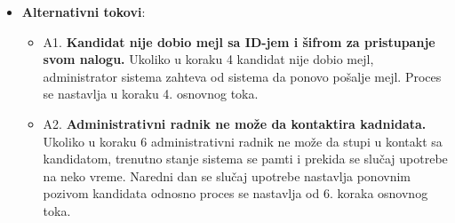\begin{itemize}
  \item \textbf{Alternativni tokovi}:
      \begin{itemize}
        \item A1. \textbf{Kandidat nije dobio mejl sa ID-jem i šifrom za pristupanje svom nalogu.}
        Ukoliko u koraku 4 kandidat nije dobio mejl, administrator sistema zahteva od sistema da ponovo pošalje mejl. Proces se nastavlja u koraku 4. osnovnog toka.
        \item A2. \textbf{Administrativni radnik ne može da kontaktira kadnidata.}
        Ukoliko u koraku 6 administrativni radnik ne može da stupi u kontakt sa kandidatom, trenutno stanje sistema se pamti i prekida se slučaj upotrebe na neko vreme. Naredni dan se slučaj upotrebe nastavlja ponovnim pozivom kandidata odnosno proces se nastavlja od 6. koraka osnovnog toka.
      \end{itemize}
\end{itemize}